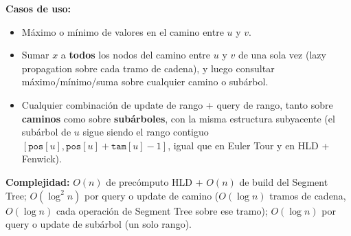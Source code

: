 \documentclass[10pt,a4paper,twocolumn]{article}
\begin{document}
\textbf{Casos de uso:}

\begin{itemize}
    \item Máximo o mínimo de valores en el camino entre $u$ y $v$.
    \item Sumar $x$ a \textbf{todos} los nodos del camino entre $u$ y
    $v$ de una sola vez (lazy propagation sobre cada tramo de
    cadena), y luego consultar máximo/mínimo/suma sobre cualquier
    camino o subárbol.
    \item Cualquier combinación de update de rango + query de rango,
    tanto sobre \textbf{caminos} como sobre \textbf{subárboles}, con
    la misma estructura subyacente (el subárbol de $u$ sigue siendo
    el rango contiguo $[\texttt{pos}[u], \texttt{pos}[u]+\texttt{tam}[u]-1]$,
    igual que en Euler Tour y en HLD + Fenwick).
\end{itemize}

\textbf{Complejidad:} $O(n)$ de precómputo HLD + $O(n)$ de build del
Segment Tree; $O(\log^2 n)$ por query o update de camino ($O(\log n)$
tramos de cadena, $O(\log n)$ cada operación de Segment Tree sobre
ese tramo); $O(\log n)$ por query o update de subárbol (un solo
rango).
\end{document}
